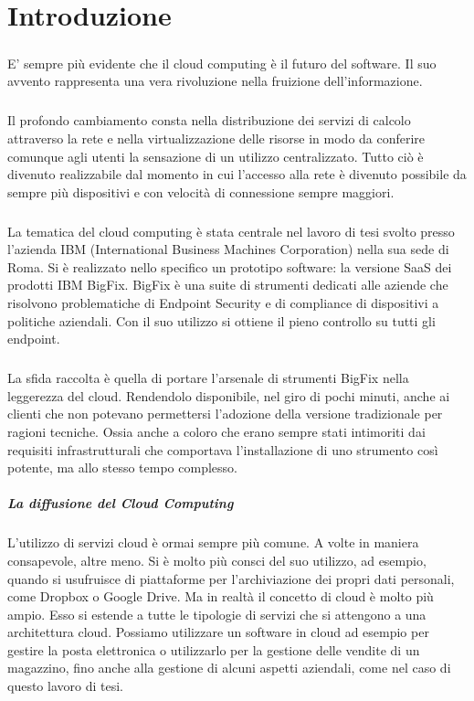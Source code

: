 \chapter{Introduzione}

\paragraph{}
E' sempre più evidente che il cloud computing è il futuro del software. Il suo avvento rappresenta una vera rivoluzione nella fruizione dell'informazione.
\paragraph{}
Il profondo cambiamento consta nella distribuzione dei servizi di calcolo attraverso la rete e nella virtualizzazione delle risorse in modo da conferire comunque agli utenti la sensazione di un utilizzo centralizzato. Tutto ciò è divenuto realizzabile dal momento in cui l'accesso alla rete è divenuto possibile da sempre più dispositivi e con velocità di connessione sempre maggiori.
\paragraph{}
La tematica del cloud computing è stata centrale nel lavoro di tesi svolto presso l'azienda IBM (International Business Machines Corporation) nella sua sede di Roma. Si è realizzato nello specifico un prototipo software: la versione SaaS dei prodotti IBM BigFix. BigFix è una suite di strumenti dedicati alle aziende che risolvono problematiche di Endpoint Security e di compliance di dispositivi a politiche aziendali. Con il suo utilizzo si ottiene il pieno controllo su tutti gli endpoint.
\paragraph{}
La sfida raccolta è quella di portare l'arsenale di strumenti BigFix nella leggerezza del cloud. Rendendolo disponibile, nel giro di pochi minuti, anche ai clienti che non potevano permettersi l'adozione della versione tradizionale per ragioni tecniche. Ossia anche a coloro che erano sempre stati intimoriti dai requisiti infrastrutturali che comportava l'installazione di uno strumento così potente, ma allo stesso tempo complesso.

\paragraph{La diffusione del Cloud Computing}
L'utilizzo di servizi cloud è ormai sempre più comune. A volte in maniera consapevole, altre meno. Si è molto più consci del suo utilizzo, ad esempio, quando si usufruisce di piattaforme per l'archiviazione dei propri dati personali, come Dropbox o Google Drive. Ma in realtà il concetto di cloud è molto più ampio. Esso si estende a tutte le tipologie di servizi che si attengono a una architettura cloud. Possiamo utilizzare un software in cloud ad esempio per gestire la posta elettronica o utilizzarlo per la gestione delle vendite di un magazzino, fino anche alla gestione di alcuni aspetti aziendali, come nel caso di questo lavoro di tesi.
